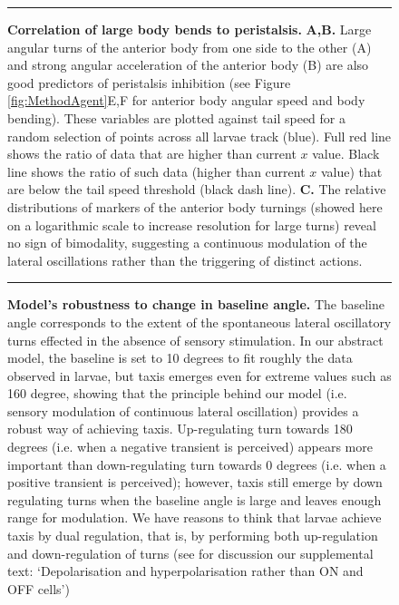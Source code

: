 \documentclass[11pt,a4paper]{article}
\begin{document}
\renewcommand{\figurename}{Figure 2 Supplement}
\setcounter{figure}{0}
\newrefformat{fig}{Figure 2S\ref{#1}]}
\begin{figure}
\begin{center}
\caption{{\bf Correlation of large body bends to peristalsis.}
 {\bf A,B.} Large angular turns of the anterior body from one side to the other (A) and strong angular acceleration of the anterior body (B) are also good predictors of peristalsis inhibition (see Figure \ref{fig:MethodAgent}E,F for anterior body angular speed and body bending). These variables are plotted against tail speed for a random selection of points across all larvae track (blue). Full red line shows the ratio of data that are higher than current $x$ value. Black line shows the ratio of such data (higher than current $x$ value) that are below the tail speed threshold (black dash line).
 {\bf C.} The relative distributions of markers of the anterior body turnings (showed here on a logarithmic scale to increase resolution for large turns) reveal no sign of bimodality, suggesting a continuous modulation of the lateral oscillations rather than the triggering of distinct actions.
\label{fig2S:FigS2}}
\end{center}
\hrule
\end{figure}



\renewcommand{\figurename}{Figure 3 Supplement}
\setcounter{figure}{0}
\newrefformat{fig}{Figure 3S\ref{#1}]}
\begin{figure}
\begin{center}
\caption{{\bf Model’s robustness to change in baseline angle.}
The baseline angle corresponds to the extent of the spontaneous lateral oscillatory turns effected in the absence of sensory stimulation. In our abstract model, the baseline is set to 10 degrees to fit roughly the data observed in larvae, but taxis emerges even for extreme values such as 160 degree, showing that the principle behind our model (i.e. sensory modulation of continuous lateral oscillation) provides a robust way of achieving taxis. Up-regulating turn towards 180 degrees (i.e. when a negative transient is perceived) appears more important than down-regulating turn towards 0 degrees (i.e. when a positive transient is perceived); however, taxis still emerge by down regulating turns when the baseline angle is large and leaves enough range for modulation. We have reasons to think that larvae achieve taxis by dual regulation, that is, by performing both up-regulation and down-regulation of turns (see for discussion our supplemental text: ‘Depolarisation and hyperpolarisation rather than ON and OFF cells’)   
\label{fig3S:FigS3}}
\end{center}
\hrule
\end{figure}
%

\clearpage


\newpage
\clearpage

%


\end{document}
